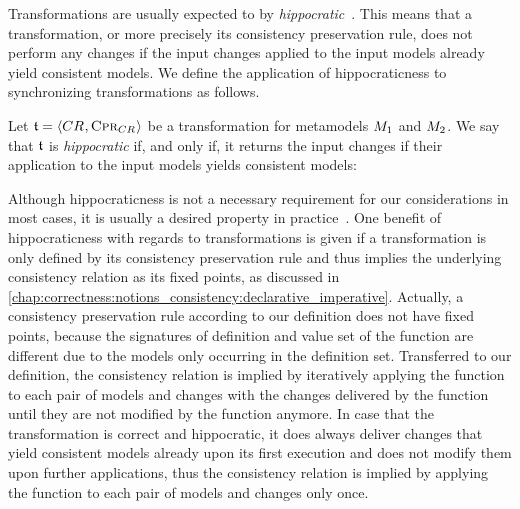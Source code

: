 Transformations are usually expected to by \emph{hippocratic}~\cite{stevens2010sosym}.
This means that a transformation, or more precisely its consistency preservation rule, does not perform any changes if the input changes applied to the input models already yield consistent models.
We define the application of hippocraticness to synchronizing transformations as follows.
\begin{definition}
    \label{def:hippocratictransformation}
    Let $\transformation{t} = \tupled{\consistencyrelation{CR}{}, \consistencypreservationrule{\consistencyrelation{CR}{}}}$ be a transformation for metamodels $\metamodel{M}{1}$ and $\metamodel{M}{2}$.
    We say that $\transformation{t}$ is \emph{hippocratic} if, and only if, it returns the input changes if their application to the input models yields consistent models:
\end{definition}

Although hippocraticness is not a necessary requirement for our considerations in most cases, it is usually a desired property in practice~\cite{stevens2010sosym}.
One benefit of hippocraticness with regards to transformations is given if a transformation is only defined by its consistency preservation rule and thus implies the underlying consistency relation as its fixed points, as discussed in \autoref{chap:correctness:notions_consistency:declarative_imperative}.
Actually, a consistency preservation rule according to our definition does not have fixed points, because the signatures of definition and value set of the function are different due to the models only occurring in the definition set.
Transferred to our definition, the consistency relation is implied by iteratively applying the function to each pair of models and changes with the changes delivered by the function until they are not modified by the function anymore.
In case that the transformation is correct and hippocratic, it does always deliver changes that yield consistent models already upon its first execution and does not modify them upon further applications, thus the consistency relation is implied by applying the function to each pair of models and changes only once.

